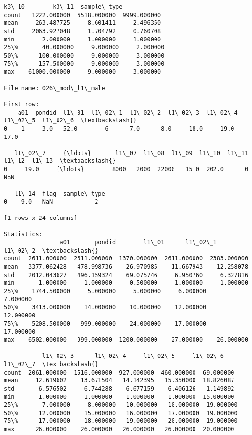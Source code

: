 \documentclass[11pt]{article}
\begin{document}
\begin{Verbatim}[commandchars=\\\{\}]
              k3\_10        k3\_11  sample\_type  
count   1222.000000  6518.000000  9999.000000  
mean     263.487725     8.601411     2.496350  
std     2063.927048     1.704792     0.760708  
min        2.000000     1.000000     1.000000  
25\%       40.000000     9.000000     2.000000  
50\%      100.000000     9.000000     3.000000  
75\%      157.500000     9.000000     3.000000  
max    61000.000000     9.000000     3.000000  

File name: 026\_mod\_l1\_male

First row: 
    a01  pondid  l1\_01  l1\_02\_1  l1\_02\_2  l1\_02\_3  l1\_02\_4  l1\_02\_5  l1\_02\_6  \textbackslash{}
0    1     3.0   52.0        6      7.0      8.0     18.0     19.0     17.0   

   l1\_02\_7     {\ldots}       l1\_07  l1\_08  l1\_09  l1\_10  l1\_11  l1\_12  l1\_13  \textbackslash{}
0     19.0     {\ldots}        8000   2000  22000   15.0  202.0      0    NaN   

   l1\_14  flag  sample\_type  
0    9.0   NaN            2  

[1 rows x 24 columns]

Statistics: 
                a01       pondid        l1\_01      l1\_02\_1      l1\_02\_2  \textbackslash{}
count  2611.000000  2611.000000  1370.000000  2611.000000  2383.000000   
mean   3377.062428   478.998736    26.970985    11.667943    12.258078   
std    2012.043627   496.159324    69.075746     6.950760     6.327816   
min       1.000000     1.000000     0.500000     1.000000     1.000000   
25\%    1744.500000     5.000000     5.000000     6.000000     7.000000   
50\%    3413.000000    14.000000    10.000000    12.000000    12.000000   
75\%    5208.500000   999.000000    24.000000    17.000000    17.000000   
max    6502.000000   999.000000  1200.000000    27.000000    26.000000   

           l1\_02\_3      l1\_02\_4     l1\_02\_5     l1\_02\_6    l1\_02\_7  \textbackslash{}
count  2061.000000  1516.000000  927.000000  460.000000  69.000000   
mean     12.619602    13.671504   14.142395   15.350000  18.826087   
std       6.576502     6.744288    6.677159    6.406126   1.149892   
min       1.000000     1.000000    1.000000    1.000000  15.000000   
25\%       7.000000     8.000000   10.000000   10.000000  19.000000   
50\%      12.000000    15.000000   16.000000   17.000000  19.000000   
75\%      17.000000    18.000000   19.000000   20.000000  19.000000   
max      26.000000    26.000000   26.000000   26.000000  20.000000   


\end{Verbatim}
\end{document}
